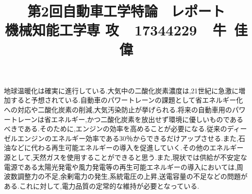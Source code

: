 \documentclass[a4paper,12pt]{jarticle}
\begin{document}
%
\title{\vspace{-30mm}  第2回自動車工学特論 \ レポート \\ 機械知能工学専
攻~~17344229~~牛~佳偉}
\date{}
%
\maketitle
%
\vspace{-20mm}
%
地球温暖化は確実に進行している.大気中の二酸化炭素濃度は,21世紀に急激に増加すると予想されている.自動車のパワートレーンの課題として省エネルギー化への対応や二酸化炭素の削減,大気汚染防止が挙げられる.将来の自動車用のパワートレーンは省エネルギー,かつ二酸化炭素を放出せず環境に優しいものであるべきである.そのために,エンジンの効率を高めることが必要になる.従来のディーゼルエンジンのエネルギー効率である30$％$からできるだけアップさせる.また,石油などに代わる再生可能エネルギーの導入を促進していく.その他のエネルギー源として,天然ガスを使用することができると思う.また,現状では供給が不安定な電源である太陽光発電や風力発電等の再生可能エネルギーの導入においては,周波数調整力の不足,余剰電力の発生,系統電圧の上昇,送電容量の不足などの問題がある.これに対して,電力品質の定常的な維持が必要となっている.
\end{document}
